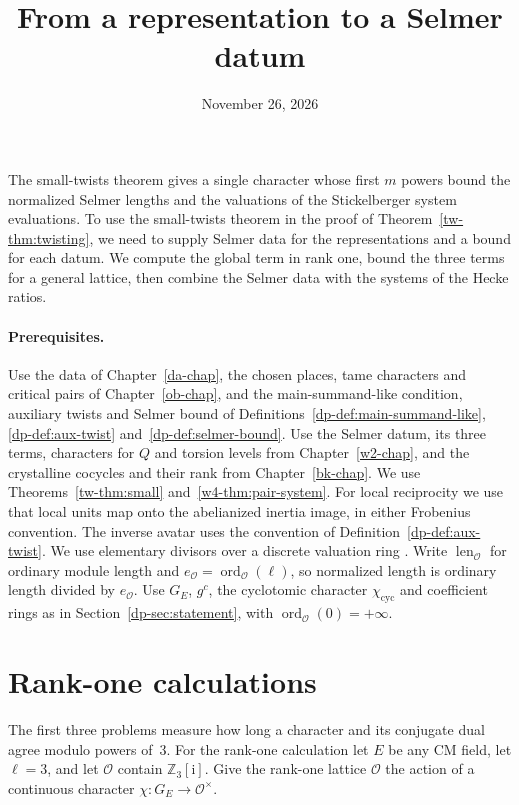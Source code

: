\documentclass[reqno]{amsart}
\title{From a representation to a Selmer datum}
\author{}
\date{November 26, 2026}
\newcounter{chap}
\theoremstyle{definition}
\theoremstyle{plain}
\theoremstyle{remark}
\newcommand{\Z}{\mathbb Z}
\newcommand{\Oc}{\mathcal O}
\newcommand{\cyc}{\chi_{\mathrm{cyc}}}
\newcommand{\ord}{\operatorname{ord}}
\newcommand{\len}{\operatorname{len}}
\begin{document}
\maketitle
{}\label{chap}

The small-twists theorem gives a single character whose first \(m\) powers bound the normalized Selmer lengths and the valuations of the Stickelberger system evaluations.  To use the small-twists theorem in the proof of Theorem~\ref{tw-thm:twisting}, we need to supply Selmer data for the representations and a bound for each datum.  We compute the global term in rank one, bound the three terms for a general lattice, then combine the Selmer data with the systems of the Hecke ratios.

\paragraph{Prerequisites.}
Use the data of Chapter~\ref{da-chap}, the chosen places, tame characters and critical pairs of Chapter~\ref{ob-chap}, and the main-summand-like condition, auxiliary twists and Selmer bound of Definitions~\ref{dp-def:main-summand-like}, \ref{dp-def:aux-twist} and~\ref{dp-def:selmer-bound}.  Use the Selmer datum, its three terms, characters for \(Q\) and torsion levels from Chapter~\ref{w2-chap}, and the crystalline cocycles and their rank from Chapter~\ref{bk-chap}.  We use Theorems~\ref{tw-thm:small} and~\ref{w4-thm:pair-system}.  For local reciprocity we use that local units map onto the abelianized inertia image, in either Frobenius convention.  The inverse avatar uses the convention of Definition~\ref{dp-def:aux-twist}.  We use elementary divisors over a discrete valuation ring \cite{La}.  Write \(\len_{\Oc}\) for ordinary module length and \(e_{\Oc}=\ord_{\Oc}(\ell)\), so normalized length is ordinary length divided by \(e_{\Oc}\).  Use \(G_E\), \(g^c\), the cyclotomic character \(\cyc\) and coefficient rings as in Section~\ref{dp-sec:statement}, with \(\ord_{\Oc}(0)=+\infty\).

\section{Rank-one calculations}\label{sec:rank-one}

The first three problems measure how long a character and its conjugate dual agree modulo powers of~\(3\).  For the rank-one calculation let \(E\) be any CM field, let \(\ell=3\), and let \(\Oc\) contain \(\Z_3[\mathrm i]\).  Give the rank-one lattice \(\Oc\) the action of a continuous character \(\chi\colon G_E\to\Oc^\times\).
\end{document}
